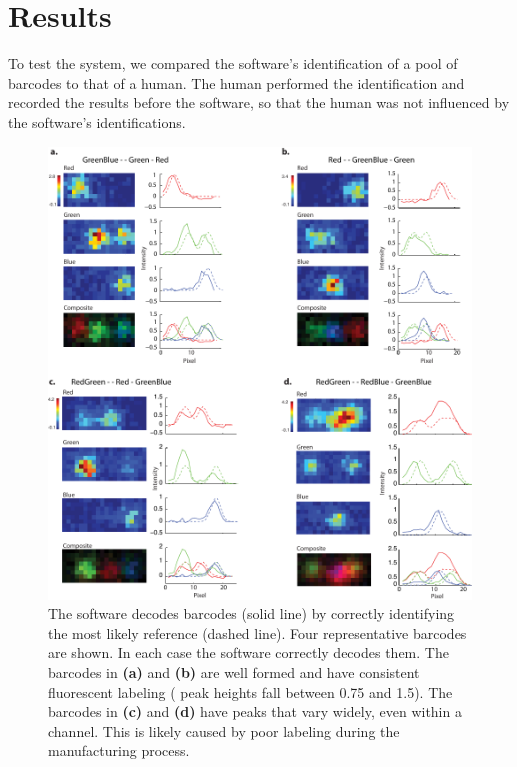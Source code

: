 \section{Results}
To test the system, we compared the software's identification of a pool of barcodes to that of a human. The human performed the identification and recorded the results before the software, so that the human was not influenced by the software's identifications. 

\begin{figure}[htbp]
\begin{center}
	\includegraphics[width=\textwidth]{figures/theoryFittedBarcodes}
	\caption{The software decodes barcodes (solid line) by correctly identifying the most likely reference (dashed line). Four representative barcodes are shown. In each case the software correctly decodes them. The barcodes in \textbf{(a)} and  \textbf{(b)} are well formed and have consistent fluorescent labeling ( peak heights fall between 0.75 and 1.5). The barcodes in \textbf{(c)} and  \textbf{(d)} have peaks that vary widely, even within a channel. This is likely caused by poor labeling during the manufacturing process. \label{fig:fittedBarcodes}}
\end{center}	
\end{figure}

